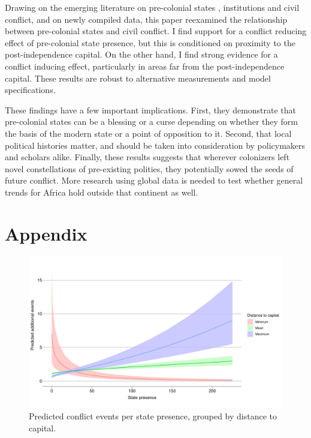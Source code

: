 \documentclass[12pt]{article}
\begin{document}
Drawing on the emerging literature on pre-colonial states \citep{Paine2019,
Depetris-Chauvin2016}, institutions \citep{Wig2016, Englebert2002,
Michalopoulos2018} and civil conflict, and on newly compiled data, this paper
reexamined the relationship between pre-colonial states and civil conflict. I
find support for a conflict reducing effect of pre-colonial state presence, but
this is conditioned on proximity to the post-independence capital. On the other
hand, I find strong evidence for a conflict inducing effect, particularly in
areas far from the post-independence capital. These results are robust to
alternative measurements and model specifications.

These findings have a few important implications. First, they demonstrate that
pre-colonial states can be a blessing or a curse depending on whether they form
the basis of the modern state or a point of opposition to it. Second, that local
political histories matter, and should be taken into consideration by
policymakers and scholars alike. Finally, these results suggests that wherever
colonizers left novel constellations of pre-existing polities, they potentially
sowed the seeds of future conflict. More research using global data is needed to
test whether general trends for Africa hold outside that continent as well.


\pagebreak




\pagebreak
\section*{Appendix}









\begin{figure}[htpb]
	\centering
	\includegraphics[width=\linewidth]{"../R/Output/SBzinbplot.pdf"}
	\caption{Predicted conflict events per state presence, grouped by
	distance to capital.}
	\label{state_int}
\end{figure}
\end{document}
